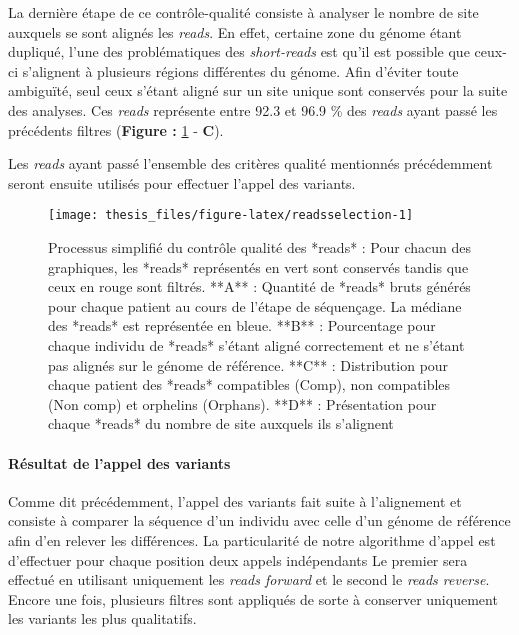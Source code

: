 \documentclass[12pt,twoside]{reedthesis}
\theoremstyle{definition}
\theoremstyle{definition}
\theoremstyle{remark}
\begin{document}
  La dernière étape de ce contrôle-qualité consiste à analyser le nombre
  de site auxquels se sont alignés les \emph{reads}. En effet, certaine
  zone du génome étant dupliqué, l'une des problématiques des
  \emph{short-reads} est qu'il est possible que ceux-ci s'alignent à
  plusieurs régions différentes du génome. Afin d'éviter toute ambiguïté,
  seul ceux s'étant aligné sur un site unique sont conservés pour la suite
  des analyses. Ces \emph{reads} représente entre 92.3 et 96.9 \% des
  \emph{reads} ayant passé les précédents filtres (\textbf{Figure :
  }\ref{fig:readsselection} - \textbf{C}).
  
  Les \emph{reads} ayant passé l'ensemble des critères qualité mentionnés
  précédemment seront ensuite utilisés pour effectuer l'appel des
  variants.
  
  \newpage
  
  \begin{figure}
  
  {\centering \texttt{[image: thesis\_files/figure-latex/readsselection-1]} 
  
  }
  
  \caption[Processus simplifié du contrôle qualité des *reads*]{Processus simplifié du contrôle qualité des *reads* : Pour chacun des graphiques, les *reads* représentés en vert sont conservés tandis que ceux en rouge sont filtrés. **A** : Quantité de *reads* bruts générés pour chaque patient au cours de l'étape de séquençage. La médiane des *reads* est représentée en bleue. **B** : Pourcentage pour chaque individu de *reads* s'étant aligné correctement et ne s'étant pas alignés sur le génome de référence. **C** : Distribution pour chaque patient des *reads* compatibles (Comp), non compatibles (Non comp) et orphelins (Orphans). **D** : Présentation pour chaque *reads* du nombre de site auxquels ils s'alignent}\label{fig:readsselection}
  \end{figure}
  
  \newpage
  
  \paragraph{Résultat de l'appel des
  variants}\label{resultat-de-lappel-des-variants}
  
  Comme dit précédemment, l'appel des variants fait suite à l'alignement
  et consiste à comparer la séquence d'un individu avec celle d'un génome
  de référence afin d'en relever les différences. La particularité de
  notre algorithme d'appel est d'effectuer pour chaque position deux
  appels indépendants Le premier sera effectué en utilisant uniquement les
  \emph{reads forward} et le second le \emph{reads reverse}. Encore une
  fois, plusieurs filtres sont appliqués de sorte à conserver uniquement
  les variants les plus qualitatifs.
  
\end{document}
